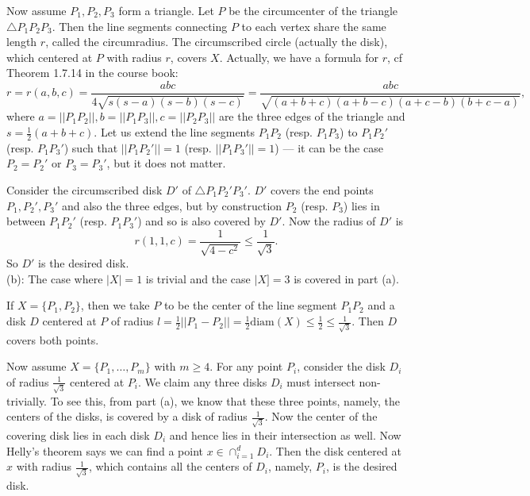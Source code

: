 \documentclass[12pt,reqno]{amsart}
\theoremstyle{definition}
\newcommand{\diam}[1]{\mathrm{diam}(#1)}
\begin{document}
Now assume $P_1, P_2, P_3$ form a triangle. Let $P$ be the circumcenter of the triangle $\triangle P_1P_2P_3$. Then the line segments connecting $P$ to each vertex share the same length $r$, called the circumradius. The circumscribed circle (actually the disk), which centered at $P$ with radius $r$, covers $X$. Actually, we have a formula for $r$, cf Theorem 1.7.14 in the course book: \[r=r(a,b,c) =\frac{abc}{4\sqrt{s(s-a)(s-b)(s-c)}}= \frac{abc}{\sqrt{(a+b+c)(a+b-c)(a+c-b)(b+c-a)}},\] where $a=||P_1P_2||,b=||P_1P_3||,c=||P_2P_3||$ are the three edges of the triangle and $s=\frac{1}{2}(a+b+c)$. Let us extend the line segments $P_1P_2$ (resp. $P_1P_3$) to $P_1P_2'$ (resp. $P_1P_3'$) such that $||P_1P_2'||=1$ (resp. $||P_1P_3'||=1$) --- it can be the case $P_2=P_2'$ or $P_3=P_3'$, but it does not matter.

\begin{center}
\end{center}

Consider the circumscribed disk $D'$ of $\triangle P_1P_2'P_3'$. $D'$ covers the end points $P_1, P_2', P_3'$ and also the three edges, but by construction $P_2$ (resp. $P_3$) lies in between $P_1P_2'$ (resp. $P_1P_3'$) and so is also covered by $D'$. Now the radius of $D'$ is $$ r(1,1,c) =\frac{1}{\sqrt{4-c^2}} \leq \frac{1}{\sqrt{3}}.$$ So $D'$ is the desired disk.\\



(b): The case where $|X|=1$ is trivial and the case $|X]=3$ is covered in part (a).

If $X=\{P_1, P_2\}$, then we take $P$ to be the center of the line segment $P_1P_2$ and a disk $D$ centered at $P$ of radius $l = \frac{1}{2} ||P_1-P_2|| = \frac{1}{2}\diam{X} \leq \frac{1}{2} \leq \frac{1}{\sqrt{3}}$. Then $D$ covers both points.

Now assume $X=\{P_1,\dots,P_m\}$ with $m\geq 4$. For any point $P_i$, consider the disk $D_i$ of radius $\frac{1}{\sqrt{3}}$ centered at $P_i$. We claim any three disks $D_i$ must intersect non-trivially. To see this, from part (a), we know that these three points, namely, the centers of the disks, is covered by a disk of radius $\frac{1}{\sqrt{3}}$. Now the center of the covering disk lies in each disk $D_i$ and hence lies in their intersection as well. Now Helly's theorem says we can find a point $x\in \cap_{i=1}^d D_i$. Then the disk centered at $x$ with radius $\frac{1}{\sqrt{3}}$, which contains all the centers of $D_i$, namely, $P_i$, is the desired disk.
\end{document}

